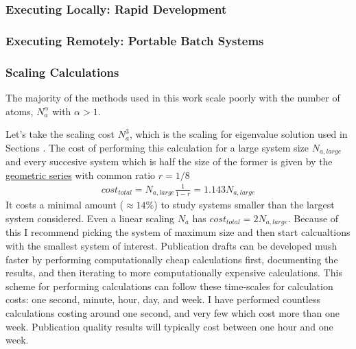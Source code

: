 \subsubsection{\label{A:coding_lang:Execute:Local}
Executing Locally: Rapid Development}

\subsubsection{\label{A:coding_lang:Execute:Remote}
Executing Remotely: Portable Batch Systems}

\subsubsection{\label{A:coding_lang:Execute:Scaling}
Scaling Calculations}

The majority of the methods 
used in this work scale poorly with the number of atoms, $N_a^\alpha$ 
with $\alpha >1$. 

Let's take the scaling cost $N_a^3$, which is the scaling for 
eigenvalue solution used in Sections . 
The cost of performing this calculation for a large system size 
$N_{a,large}$  
and every succesive system which is half the size of the former 
is given by the 
\href{http://en.wikipedia.org/wiki/Geometric_series}{geometric series} 
with common ratio $r=1/8$
\begin{equation}\label{EQ:cost_total}
\begin{split}
cost_{total} = N_{a,large}\frac{1}{1-r} = 1.143N_{a,large} 
\end{split}
\end{equation}
It costs a minimal amount ($ \approx 14\%$) to study systems smaller 
than the largest system considered. Even a linear scaling 
$N_a$ has $cost_{total} = 2N_{a,large}$. 
Because of this I recommend 
picking the system of maximum size and then start calcualtions with 
the smallest system of interest. 
Publication drafts can be 
developed mush faster by performing computationally cheap calculations 
first, documenting the results, and then iterating to more 
computationally expensive calculations. 
This scheme for performing calculations can follow these time-scales 
for calculation costs:  
one second, minute, hour, day, and week. I have performed 
countless calculations costing around one second, and very few which cost 
more than one week. Publication quality results will typically 
cost between one hour and one week.


